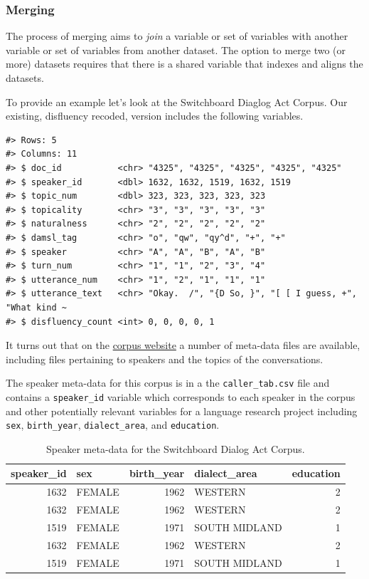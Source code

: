 \documentclass[
  letterpaper,
]{latex/krantz}
\begin{document}
\hypertarget{merging}{%
\subsubsection{Merging}\label{merging}}

The process of merging aims to \emph{join} a variable or set of
variables with another variable or set of variables from another
dataset. The option to merge two (or more) datasets requires that there
is a shared variable that indexes and aligns the datasets.

To provide an example let's look at the Switchboard Diaglog Act Corpus.
Our existing, disfluency recoded, version includes the following
variables.

\begin{verbatim}
#> Rows: 5
#> Columns: 11
#> $ doc_id           <chr> "4325", "4325", "4325", "4325", "4325"
#> $ speaker_id       <dbl> 1632, 1632, 1519, 1632, 1519
#> $ topic_num        <dbl> 323, 323, 323, 323, 323
#> $ topicality       <chr> "3", "3", "3", "3", "3"
#> $ naturalness      <chr> "2", "2", "2", "2", "2"
#> $ damsl_tag        <chr> "o", "qw", "qy^d", "+", "+"
#> $ speaker          <chr> "A", "A", "B", "A", "B"
#> $ turn_num         <chr> "1", "1", "2", "3", "4"
#> $ utterance_num    <chr> "1", "2", "1", "1", "1"
#> $ utterance_text   <chr> "Okay.  /", "{D So, }", "[ [ I guess, +", "What kind ~
#> $ disfluency_count <int> 0, 0, 0, 0, 1
\end{verbatim}

It turns out that on the
\href{https://catalog.ldc.upenn.edu/docs/LDC97S62/}{corpus website} a
number of meta-data files are available, including files pertaining to
speakers and the topics of the conversations.

The speaker meta-data for this corpus is in a the
\texttt{caller\_tab.csv} file and contains a \texttt{speaker\_id}
variable which corresponds to each speaker in the corpus and other
potentially relevant variables for a language research project including
\texttt{sex}, \texttt{birth\_year}, \texttt{dialect\_area}, and
\texttt{education}.

\hypertarget{tbl-merging-swda-speaker}{}
\begin{table}
\caption{\label{tbl-merging-swda-speaker}Speaker meta-data for the Switchboard Dialog Act Corpus. }\tabularnewline

\centering
\begin{tabular}{rlrlr}
\toprule
speaker\_id & sex & birth\_year & dialect\_area & education\\
\midrule
1632 & FEMALE & 1962 & WESTERN & 2\\
1632 & FEMALE & 1962 & WESTERN & 2\\
1519 & FEMALE & 1971 & SOUTH MIDLAND & 1\\
1632 & FEMALE & 1962 & WESTERN & 2\\
1519 & FEMALE & 1971 & SOUTH MIDLAND & 1\\
\bottomrule
\end{tabular}
\end{table}
\end{document}
